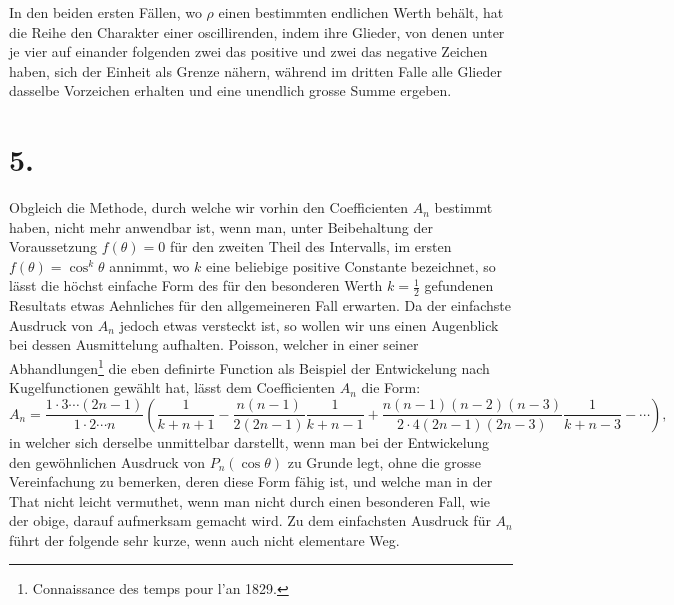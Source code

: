 \documentclass[11pt]{article}
\begin{document}
In den beiden ersten Fällen, wo $\rho$ einen bestimmten endlichen Werth behält, hat die Reihe den Charakter einer oscillirenden, indem ihre Glieder, von denen unter je vier auf einander folgenden zwei das positive und zwei das negative Zeichen haben, sich der Einheit als Grenze nähern, während im dritten Falle alle Glieder dasselbe Vorzeichen erhalten und eine unendlich grosse Summe ergeben.

\section*{5.}

Obgleich die Methode, durch welche wir vorhin den Coefficienten $A_n$ bestimmt haben, nicht mehr anwendbar ist, wenn man, unter Beibehaltung der Voraussetzung $f(\theta)=0$ für den zweiten Theil des Intervalls, im ersten $f(\theta)=\cos^k\theta$ annimmt, wo $k$ eine beliebige positive Constante bezeichnet, so lässt die höchst einfache Form des für den besonderen Werth $k=\frac12$ gefundenen Resultats etwas Aehnliches für den allgemeineren Fall erwarten. Da der einfachste Ausdruck von $A_n$ jedoch etwas versteckt ist, so wollen wir uns einen Augenblick bei dessen Ausmittelung aufhalten. Poisson, welcher in einer seiner Abhandlungen\footnote{Connaissance des temps pour l'an 1829.} die eben definirte Function als Beispiel der Entwickelung nach Kugelfunctionen gewählt hat, lässt dem Coefficienten $A_n$ die Form:
\[
 A_n=\frac{1\cdot3\cdots(2n-1)}{1\cdot2\cdots n}\left(\frac1{k+n+1}-\frac{n(n-1)}{2(2n-1)}\frac1{k+n-1}
 +\frac{n(n-1)(n-2)(n-3)}{2\cdot4(2n-1)(2n-3)}\frac1{k+n-3}-\cdots\right),
\]
in welcher sich derselbe unmittelbar darstellt, wenn man bei der Entwickelung den gewöhnlichen Ausdruck von $P_n(\cos\theta)$ zu Grunde legt, ohne die grosse Vereinfachung zu bemerken, deren diese Form fähig ist, und welche man in der That nicht leicht vermuthet, wenn man nicht durch einen besonderen Fall, wie der obige, darauf aufmerksam gemacht wird. Zu dem einfachsten Ausdruck für $A_n$ führt der folgende sehr kurze, wenn auch nicht elementare Weg.
\end{document}
